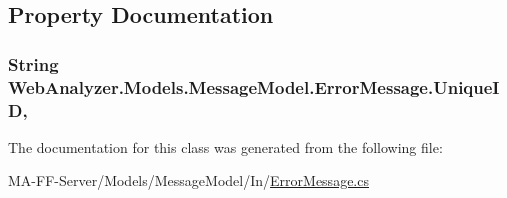 \subsection{Property Documentation}
\hypertarget{class_web_analyzer_1_1_models_1_1_message_model_1_1_error_message_a795e90650dd234f29a110e27643828e2}{}
\subsubsection[{Unique\+I\+D}]{\setlength{\rightskip}{0pt plus 5cm}String Web\+Analyzer.\+Models.\+Message\+Model.\+Error\+Message.\+Unique\+I\+D\hspace{0.3cm}{\ttfamily [get]}, {\ttfamily [set]}}\label{class_web_analyzer_1_1_models_1_1_message_model_1_1_error_message_a795e90650dd234f29a110e27643828e2}


The documentation for this class was generated from the following file\+:\begin{DoxyCompactItemize}
\item 
M\+A-\/\+F\+F-\/\+Server/\+Models/\+Message\+Model/\+In/\hyperlink{_error_message_8cs}{Error\+Message.\+cs}\end{DoxyCompactItemize}
